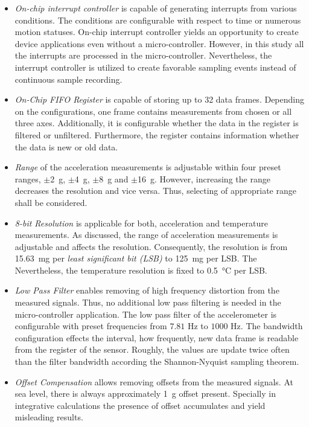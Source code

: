 \documentclass[english,12pt,a4paper,pdftex,elec,utf8]{aaltothesis}
\begin{document}
\begin{itemize}
\item \textit{On-chip interrupt controller} is capable of generating  interrupts from various conditions. The conditions are configurable with respect to time or numerous motion statuses. On-chip interrupt controller yields an opportunity to create device applications even without a micro-controller. However, in this study all the interrupts are processed in the micro-controller. Nevertheless, the interrupt controller is utilized to create favorable sampling events instead of continuous sample recording.

\item \textit{On-Chip FIFO Register} is capable of storing up to 32 data frames. Depending on the configurations, one frame contains measurements from chosen or all three axes. Additionally, it is configurable whether the data in the register is filtered or unfiltered. Furthermore, the register contains information whether the data is new or old data.

\item \textit{Range} of the acceleration measurements is adjustable within four preset ranges,  $\pm$\SI{2}{\gram}, $\pm$\SI{4}{\gram}, $\pm$\SI{8}{\gram} and $\pm$\SI{16}{\gram}. However, increasing the range decreases the resolution and vice versa. Thus, selecting of appropriate range shall be considered.

\item \textit{8-bit Resolution} is applicable for both, acceleration and temperature measurements. As discussed, the range of acceleration measurements is adjustable and affects the resolution. Consequently, the resolution is from \SI{15.63}{\milli\gram} per \textit{least significant bit (LSB)} to \SI{125}{\milli\gram} per LSB. The  Nevertheless, the temperature resolution is fixed to \SI{0.5}{\celsius} per LSB.

\item \textit{Low Pass Filter} enables removing of high frequency distortion from the measured signals. Thus, no additional low pass filtering is needed in the micro-controller application. The low pass filter of the accelerometer is configurable with preset frequencies from $7.81$ Hz to $1000$ Hz. The bandwidth configuration effects the interval, how frequently, new data frame is readable from the register of the sensor. Roughly, the values are update twice often than the filter bandwidth according the Shannon-Nyquist sampling theorem.

\item \textit{Offset Compensation} allows removing offsets from the measured signals. At sea level, there is always approximately \SI{1}{\gram} offset present. Specially in integrative calculations the presence of offset accumulates and yield misleading results.



\end{itemize}
\end{document}
